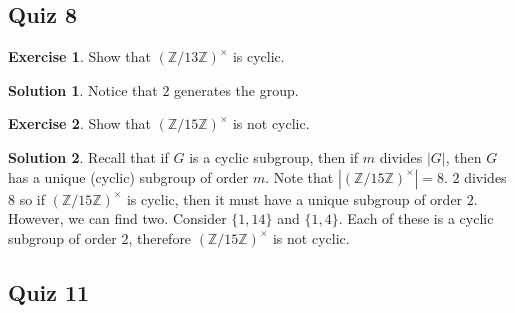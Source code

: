 \documentclass[12pt]{article}
\theoremstyle{definition}
\newcommand{\Z}{\mathbb{Z}}
\newtheorem{exercise}{\color{YellowOrange}Exercise}
\theoremstyle{definition}
\newtheorem{solution}{\color{Goldenrod}Solution}
\begin{document}
\subsection{Quiz 8}
\begin{exercise}
	Show that $(\Z/13 \Z)^{\times}$ is cyclic. 
\end{exercise}
\begin{solution}
	Notice that $2$ generates the group. 
\end{solution}

\begin{exercise}
	Show that $(\Z/15 \Z)^{\times}$ is not cyclic. 
\end{exercise}
\begin{solution}
	Recall that if $G$ is a cyclic subgroup, then if $m$ divides $|G|$, then $G$ has a unique (cyclic) subgroup of order $m$. Note that $|(\Z/15 \Z)^{\times}| = 8$. $2$ divides $8$ so if $(\Z/15 \Z)^{\times}$ is cyclic, then it must have a unique subgroup of order $2$. However, we can find two. Consider $\{1,14\}$ and $\{1,4\}$. Each of these is a cyclic subgroup of order $2$, therefore $(\Z/15 \Z)^{\times}$ is not cyclic. 
\end{solution}

\subsection{Quiz 11}
\end{document}
